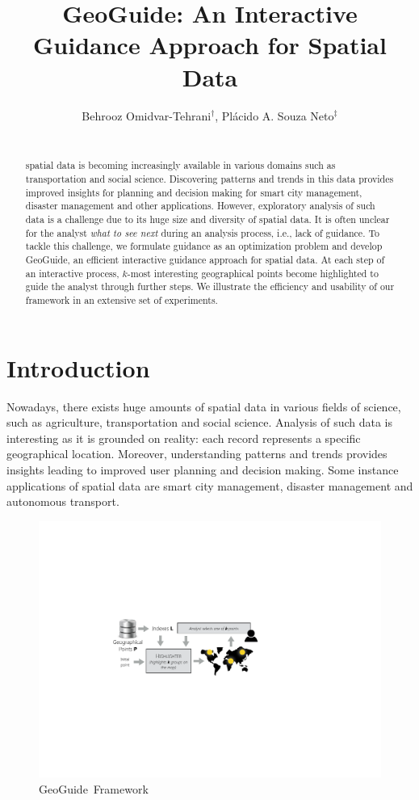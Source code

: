 \documentclass{vldb}
\title{GeoGuide: An Interactive Guidance Approach for Spatial Data}
\author{
Behrooz Omidvar-Tehrani$^{\dag}$, Pl\'acido A. Souza Neto$^{\ddag}$\\
\affaddr{
$^{\dag}$The Ohio State University, USA, $^{\ddag}$Federal Institute of Rio Grande do Norte - IFRN, Brazil}\\
\affaddr{
$^{\dag}$\path{omidvar-tehrani.1@osu.edu},
$^{\ddag}$\path{placido.neto@ifrn.edu.br}
}}
\date{}
\newcommand{\framework}{{\sc GeoGuide}}
\begin{document}
\maketitle

\begin{abstract}
spatial data is becoming increasingly available in various domains such as transportation and social science. Discovering patterns and trends in this data provides improved insights for planning and decision making for smart city management, disaster management and other applications. However, exploratory analysis of such data is a challenge due to its huge size and diversity of spatial data. It is often unclear for the analyst {\em what to see next} during an analysis process, i.e., lack of guidance. To tackle this challenge, we formulate guidance as an optimization problem and develop \framework, an efficient interactive guidance approach for spatial data. At each step of an interactive process, $k$-most interesting geographical points become highlighted to guide the analyst through further steps. We illustrate the efficiency and usability of our framework in an extensive set of experiments.
\end{abstract}

\section{Introduction} 
Nowadays, there exists huge amounts of spatial data in various fields of science, such as agriculture, transportation and social science. Analysis of such data is interesting as it is grounded
on reality: each record represents a specific geographical location. Moreover, understanding patterns and trends provides insights leading to improved user planning and decision making. Some instance applications of spatial data are smart city management, disaster management and autonomous transport.

\begin{figure}[t]
  \centering
  \includegraphics[width=\columnwidth]{figs/framework}
\caption{\framework\ Framework}
\label{fig:framework}
\vspace{-10pt}
\end{figure}
\end{document}
